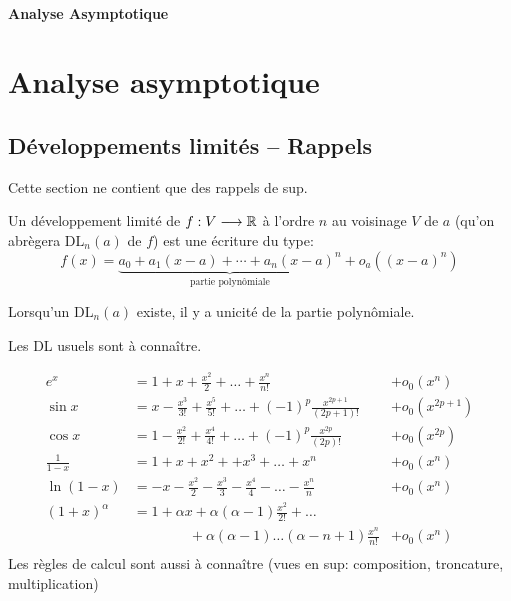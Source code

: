 \ifsolo
    ~

    \vspace{1cm}

    \begin{center}
        \textbf{\LARGE Analyse Asymptotique} \\[1em]
    \end{center}
    \tableofcontents
\else
    \chapter{Analyse asymptotique}

    \minitoc
\fi
\thispagestyle{empty}

\ifsolo \newpage \setcounter{page}{1} \fi
\section{Développements limités -- Rappels}

Cette section ne contient que des rappels de sup.

\begin{dfn}
    Un développement limité de $f:V\longrightarrow \mathbb R$ à l'ordre $n$ au voisinage $V$ de $a$ (qu'on abrègera $\mathrm{DL}_n(a)$ de $f$) est une écriture du type: \[
        f(x)=\underbrace{a_0+a_1(x-a)+\cdots +a_n(x-a)^n}_{\text{partie polynômiale}}+o_a((x-a)^n)
    \]
\end{dfn}

\begin{rem}
    Lorsqu'un $\mathrm{DL}_n(a)$ existe, il y a unicité de la partie polynômiale.
\end{rem}

\begin{rem}
    Les DL usuels sont à connaître.

\begin{align*}
    e^x &= 1 + x + \frac{x^2}{2} +\ldots+ \frac{x^n}{n!} &+ o_0(x^n) \\
    \sin x &= x - \frac{x^3}{3!}+\frac{x^5}{5!} +\ldots+(-1)^p\frac{x^{2p+1}}{(2p+1)!}
           & +o_0(x^{2p+1} ) \\
    \cos x &= 1 - \frac{x^2}{2!}+\frac{x^4}{4!} +\ldots+(-1)^p\frac{x^{2p}}{(2p)!}
           & +o_0(x^{2p}) \\
    \frac{1}{1-x} &= 1 + x + x^2 + + x^3 + \ldots + x^n
        & + o_0(x^n) \\
    \ln (1-x) &= -x - \frac{x^2}{2} - \frac{x^3}{3} - \frac{x^4}{4} - \ldots - \frac{x^n}{n}
        & + o_0(x^n) \\
    (1+x)^\alpha &= 1 + \alpha x + \alpha (\alpha-1) \frac{x^2}{2!} + \ldots \\
        & \qquad\qquad +\alpha(\alpha-1)\ldots(\alpha-n+1)\frac{x^n}{n!}
        & + o_0(x^n) \\
\end{align*}
Les règles de calcul sont aussi à connaître (vues en sup: composition, troncature, multiplication)
\end{rem}

